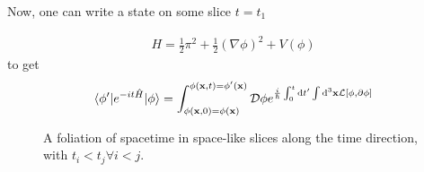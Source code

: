   Now, one can write a state on some slice $t=t_1$ 
  
  \begin{align}
   H=\frac{1}{2}\pi^2 + \frac{1}{2}(\nabla \phi)^2 + V(\phi)
 \end{align}
  to get
  \begin{align} \label{ch2:transition_amplitude}
   \braket{\phi^\prime | e^{-it \hat{H}} | \phi} = \int_{\phi(\bold{x},0) = \phi(\bold x)}^{\phi(\bold{x},t) = \phi^\prime(\bold x)} \mathcal{D} \phi e^{\frac{i}{\hbar} \int_0^t \mathrm{d}t^\prime \int \mathrm{d}^3 \bold{x} \mathcal{L}[\phi,\partial \phi]}
  \end{align}
  
  
  

  \begin{figure}
\centering
  
  \caption{A foliation of spacetime in space-like slices along the time direction, with $t_i < t_j \forall i<j$.}
  \label{ch2:foliatefig}
\end{figure}  
  
